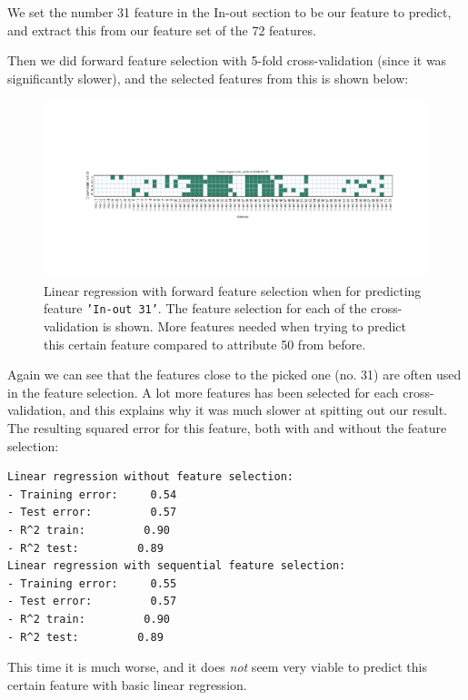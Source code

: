 We set the number 31 feature in the In-out section to be our feature to predict, and extract this from our feature set of the 72 features. 


Then we did forward feature selection with 5-fold cross-validation (since it was significantly slower), and the selected features from this is shown below:

\begin{figure}[H]
\centering
\includegraphics[width=\linewidth, trim= 50mm 50mm 50mm 70mm, clip]{code/linear_regression_attr31}
\caption{Linear regression with forward feature selection when for predicting feature \texttt{'In-out 31'}. The feature selection for each of the cross-validation is shown. More features needed when trying to predict this certain feature compared to attribute 50 from before.}
\label{fig:linforward_attr31}
\end{figure}

Again we can see that the features close to the picked one (no. 31) are often used in the feature selection. A lot more features has been selected for each cross-validation, and this explains why it was much slower at spitting out our result. \\

The resulting squared error for this feature, both with and without the feature selection:

\begin{verbatim}
Linear regression without feature selection:
- Training error:     0.54
- Test error:         0.57
- R^2 train:         0.90
- R^2 test:         0.89
Linear regression with sequential feature selection:
- Training error:     0.55
- Test error:         0.57
- R^2 train:         0.90
- R^2 test:         0.89
\end{verbatim}

This time it is much worse, and it does \emph{not} seem very viable to predict this certain feature with basic linear regression.


